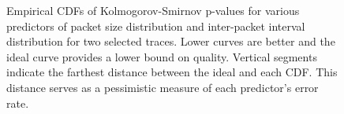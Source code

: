 \documentclass[conference]{IEEEtran}
\begin{document}
\begin{figure}[t]
\vspace{-1em}
\begin{center}
\caption{%
Empirical CDFs of Kolmogorov-Smirnov p-values for various predictors of packet size distribution and inter-packet interval distribution for two selected traces. Lower curves are better and the ideal curve provides a lower bound on quality.
Vertical segments indicate the farthest distance between the ideal and each CDF.
This distance serves as a pessimistic measure of each predictor's error rate.
}
\end{center}
\vspace{-1em}
\end{figure}
\end{document}
